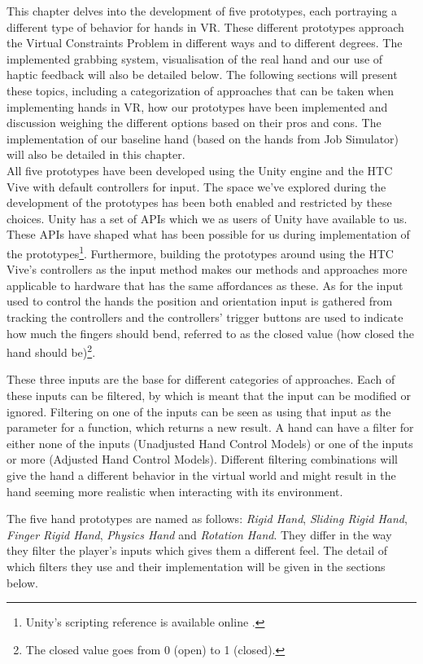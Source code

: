 This chapter delves into the development of five prototypes, each portraying a different type of behavior for hands in VR. These different prototypes approach the Virtual Constraints Problem in different ways and to different degrees. The implemented grabbing system, visualisation of the real hand and our use of haptic feedback will also be detailed below. The following sections will present these topics, including a categorization of approaches that can be taken when implementing hands in VR, how our prototypes have been implemented and discussion weighing the different options based on their pros and cons. The implementation of our baseline hand (based on the hands from Job Simulator) will also be detailed in this chapter.\\

All five prototypes have been developed using the Unity engine and the HTC Vive with default controllers for input. The space we've explored during the development of the prototypes has been both enabled and restricted by these choices. Unity has a set of APIs which we as users of Unity have available to us. These APIs have shaped what has been possible for us during implementation of the prototypes\footnote{Unity's scripting reference is available online \parencite{UnityScriptingReference2017}.}. Furthermore, building the prototypes around using the HTC Vive's controllers as the input method makes our methods and approaches more applicable to hardware that has the same affordances as these. As for the input used to control the hands the position and orientation input is gathered from tracking the controllers and the controllers' trigger buttons are used to indicate how much the fingers should bend, referred to as the closed value (how closed the hand should be)\footnote{The closed value goes from 0 (open) to 1 (closed).}.

These three inputs are the base for different categories of approaches. Each of these inputs can be filtered, by which is meant that the input can be modified or ignored. Filtering on one of the inputs can be seen as using that input as the parameter for a function, which returns a new result. A hand can have a filter for either none of the inputs (Unadjusted Hand Control Models) or one of the inputs or more (Adjusted Hand Control Models). Different filtering combinations will give the hand a different behavior in the virtual world and might result in the hand seeming more realistic when interacting with its environment.

The five hand prototypes are named as follows: \textit{Rigid Hand}, \textit{Sliding Rigid Hand}, \textit{Finger Rigid Hand}, \textit{Physics Hand} and \textit{Rotation Hand}. They differ in the way they filter the player's inputs which gives them a different feel. The detail of which filters they use and their implementation will be given in the sections below.

